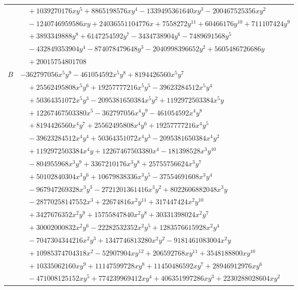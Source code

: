 \documentclass[11pt]{article}
\begin{document}
\begin{longtable}{@{}ll@{}}
 & $\quad +1039270176xy^{5}+8865198576xy^{4}-1339495361640xy^{3}-200467525356xy^{2}$\\
 & $\quad -1240746959586xy+24036551104776x+7558272y^{11}+60466176y^{10}+711107424y^{9}$\\
 & $\quad +3893349888y^{8}+6147254592y^{7}-3434738904y^{6}-7489691568y^{5}$\\
 & $\quad -432849353904y^{4}-874078479648y^{3}-2040998396652y^{2}+5605486726686y$\\
 & $\quad +20015754801708$\\
$B$ & $-362797056x^{5}y^{9}-461054592x^{5}y^{8}+8194426560x^{5}y^{7}$\\
 & $\quad +25562495808x^{5}y^{6}+19257777216x^{5}y^{5}-39623284512x^{5}y^{4}$\\
 & $\quad +50364351072x^{5}y^{3}-2095381650384x^{5}y^{2}+1192972503384x^{5}y$\\
 & $\quad +12267467503380x^{5}-362797056x^{4}y^{9}-461054592x^{4}y^{8}$\\
 & $\quad +8194426560x^{4}y^{7}+25562495808x^{4}y^{6}+19257777216x^{4}y^{5}$\\
 & $\quad -39623284512x^{4}y^{4}+50364351072x^{4}y^{3}-2095381650384x^{4}y^{2}$\\
 & $\quad +1192972503384x^{4}y+12267467503380x^{4}-181398528x^{3}y^{10}$\\
 & $\quad -804955968x^{3}y^{9}+3367210176x^{3}y^{8}+25755756624x^{3}y^{7}$\\
 & $\quad +50102840304x^{3}y^{6}+10679838336x^{3}y^{5}-37554691608x^{3}y^{4}$\\
 & $\quad -967947269328x^{3}y^{3}-2721201361416x^{3}y^{2}+8022606882048x^{3}y$\\
 & $\quad -28770258147552x^{3}+22674816x^{2}y^{11}+317447424x^{2}y^{10}$\\
 & $\quad +3427676352x^{2}y^{9}+15755847840x^{2}y^{8}+30331398024x^{2}y^{7}$\\
 & $\quad +30002000832x^{2}y^{6}-22282532352x^{2}y^{5}+1283576615928x^{2}y^{4}$\\
 & $\quad -7047304344216x^{2}y^{3}+1347746813280x^{2}y^{2}-9181461083004x^{2}y$\\
 & $\quad +10985374704318x^{2}-52907904xy^{12}+206592768xy^{11}+3548188800xy^{10}$\\
 & $\quad +10335062160xy^{9}+11147599728xy^{8}+11450486592xy^{7}+28946912976xy^{6}$\\
 & $\quad -471008125152xy^{5}+774239969412xy^{4}+406351997286xy^{3}+2230288028604xy^{2}$\\

\end{longtable}
\end{document}
